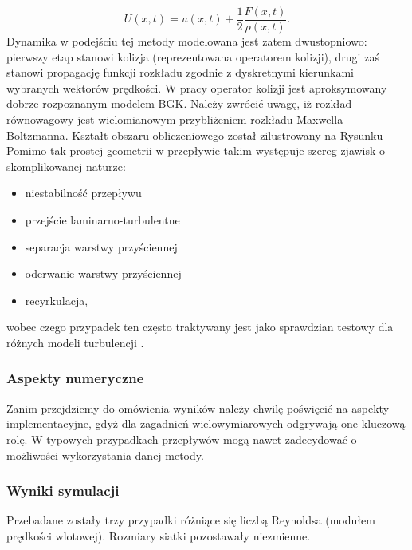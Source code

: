 \documentclass[12pt]{article}
\begin{document}
\begin{equation}
U(x,t) = u(x,t) + \frac{1}{2}\frac{F(x,t)}{\rho(x,t)}.
\end{equation}
Dynamika w podejściu tej metody modelowana jest zatem dwustopniowo: pierwszy etap stanowi kolizja (reprezentowana operatorem kolizji), drugi zaś stanowi propagację funkcji rozkładu zgodnie z dyskretnymi kierunkami wybranych wektorów prędkości. W pracy operator kolizji jest aproksymowany dobrze rozpoznanym modelem BGK. Należy zwrócić uwagę, iż rozkład równowagowy jest wielomianowym przybliżeniem rozkładu Maxwella-Boltzmanna.\newline
Kształt obszaru obliczeniowego został zilustrowany na Rysunku
Pomimo tak prostej geometrii w przepływie takim występuje szereg zjawisk o skomplikowanej naturze:
\begin{itemize}
	\item niestabilność przepływu
	\item przejście laminarno-turbulentne
	\item separacja warstwy przyściennej
	\item oderwanie warstwy przyściennej
	\item recyrkulacja,
\end{itemize}
wobec czego przypadek ten często traktywany jest jako sprawdzian testowy dla różnych modeli turbulencji \cite{Salazar}.
\subsubsection{Aspekty numeryczne}
Zanim przejdziemy do omówienia wyników należy chwilę poświęcić na aspekty implementacyjne, gdyż dla zagadnień wielowymiarowych odgrywają one kluczową rolę. W typowych przypadkach przepływów mogą nawet zadecydować o możliwości wykorzystania danej metody.
\subsubsection{Wyniki symulacji}
Przebadane zostały trzy przypadki różniące się liczbą Reynoldsa (modułem prędkości wlotowej). Rozmiary siatki pozostawały niezmienne.
\end{document}
